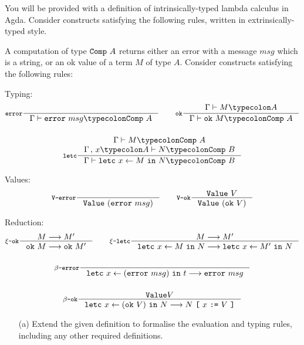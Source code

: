 \documentclass{examhons2018}
\begin{document}
\begin{enumerate}
\newcommand{\Comp}[1]{\COMP~#1}
\newcommand{\error}[1]{\ERROR~#1}
\newcommand{\ok}[1]{\OK~#1}
\newcommand{\letc}[3]{\LETC~#1\leftarrow#2~\IN~#3}

\newcommand{\comma}{\,,\,}
\newcommand{\V}{\texttt{V}}
\newcommand{\dash}{\texttt{-}}
\newcommand{\Value}{\texttt{Value}}
\newcommand{\becomes}{\longrightarrow}
\newcommand{\subst}[3]{#1~\texttt{[}~#2~\texttt{:=}~#3~\texttt{]}}

You will be provided with a definition of intrinsically-typed lambda
calculus in Agda. Consider constructs satisfying the following rules,
written in extrinsically-typed style.

A computation of type $\Comp{A}$ returns either an error with a
message $msg$ which is a string, or an ok value of a term $M$ of type $A$.
Consider constructs satisfying the following rules:

Typing:
\begin{gather*}
\inference[$\ERROR$]
  {}
  {\Gamma \vdash \error{msg} \typecolon \Comp{A}}
\qquad
\inference[$\OK$]
  {\Gamma \vdash M \typecolon A}
  {\Gamma \vdash \ok{M} \typecolon \Comp{A}}
\\~\\
\inference[$\LETC$]
  {\Gamma \vdash M \typecolon \Comp{A} \\
   \Gamma \comma x \typecolon A \vdash N \typecolon \Comp{B}}
  {\Gamma \vdash \letc{x}{M}{N} \typecolon \Comp{B}}
\end{gather*}

Values:
\begin{gather*}
\inference[\V\dash\ERROR]
  {}
  {\Value~(\error{msg})}
\qquad
\inference[\V\dash\OK]
  {\Value~V}
  {\Value~(\ok{V})}
\end{gather*}

Reduction:
\begin{gather*}
\inference[$\xi\dash\OK$]
  {M \becomes M'}
  {\ok{M} \becomes \ok{M'}}
\qquad
\inference[$\xi\dash\LETC$]
  {M \becomes M'}
  {\letc{x}{M}{N} \becomes \letc{x}{M'}{N}}
\\~\\
\inference[$\beta\dash\ERROR$]
  {}
  {\letc{x}{(\error{msg})}{t} \becomes \error{msg}}
\\~\\
\inference[$\beta\dash\OK$]
  {\Value{V}}
  {\letc{x}{(\ok{V})}{N} \becomes \subst{N}{x}{V}}
\end{gather*}

\begin{enumerate}
\item[(a)] Extend the given definition to formalise the evaluation
           and typing rules, including any other required definitions.


\end{enumerate}
\end{enumerate}
\end{document}
